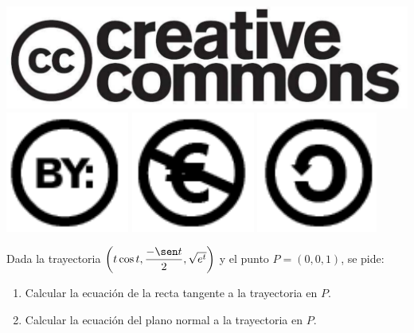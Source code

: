 \documentclass[aspectratio=149,10pt,xcolor=dvipsnames,t]{beamer}
\begin{document}
\begin{frame}[c]
\begin{center}
\biskip
\includegraphics[scale=0.07]{img/cc-logo}
\includegraphics[scale=0.2]{img/cc-by}
\includegraphics[scale=0.2]{img/cc-e}
\includegraphics[scale=0.2]{img/cc-c}
\end{center}
\end{frame}

\begin{frame}[c]
Dada la trayectoria $\left(t\cos t, \dfrac{-\sen t}{2}, \sqrt{e^t}\right)$ y el punto $P=(0,0,1)$, se
pide:
\begin{enumerate}
\item Calcular la ecuación de la recta tangente a la trayectoria en $P$.
\item Calcular la ecuación del plano normal a la trayectoria en $P$.
\end{enumerate}
\end{frame}
\end{document}
